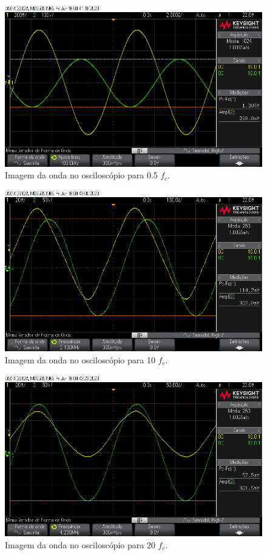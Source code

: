 \documentclass[12pt,twoside, a4paper, twocolumn]{article}
\begin{document}
\begin{figure}[H]
    \centering
    \includegraphics[width=1\columnwidth]{images/exemplo1_meio_fc.png}
    \caption{Imagem da onda no osciloscópio para 0.5 $f_c$.}
\end{figure}


\begin{figure}[H]
    \centering
    \includegraphics[width=1\columnwidth]{images/exemplo1_10_fc.png}
    \caption{Imagem da onda no osciloscópio para 10 $f_c$.}
\end{figure}


\begin{figure}[H]
    \centering
    \includegraphics[width=1\columnwidth]{images/exemplo1_20_fc.png}
    \caption{Imagem da onda no osciloscópio para 20 $f_c$.}
\end{figure}
\newpage
\end{document}
